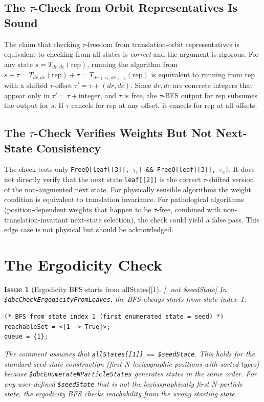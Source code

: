 \documentclass[12pt,a4paper]{article}
\theoremstyle{critical}
\newtheorem{issue}{Issue}
\theoremstyle{remark}
\begin{document}
\subsection{The $\tau$-Check from Orbit Representatives Is Sound}

The claim that checking $\tau$-freedom from translation-orbit representatives is
equivalent to checking from all states is \emph{correct} and the argument is rigorous.
For any state $s = T_{dr,dc}(\text{rep})$, running the algorithm from $s + \tau =
T_{dr,dc}(\text{rep}) + \tau = T_{dr+\tau_r, dc+\tau_c}(\text{rep})$ is equivalent to
running from $\text{rep}$ with a shifted $\tau$-offset $\tau' = \tau + (dr, dc)$. Since
$dr, dc$ are concrete integers that appear only in $\tau' = \tau + \text{integer}$, and
$\tau$ is free, the $\tau$-BFS output for rep subsumes the output for $s$. If $\tau$
cancels for rep at any offset, it cancels for rep at all offsets.

\subsection{The $\tau$-Check Verifies Weights But Not Next-State Consistency}

The check tests only \texttt{FreeQ[leaf[[3]], $\tau_r$] \&\& FreeQ[leaf[[3]], $\tau_c$]}.
It does not directly verify that the next state \texttt{leaf[[2]]} is the correct
$\tau$-shifted version of the non-augmented next state. For physically sensible
algorithms the weight condition is equivalent to translation invariance. For
pathological algorithms (position-dependent weights that happen to be $\tau$-free,
combined with non-translation-invariant next-state selection), the check could yield a
false pass. This edge case is not physical but should be acknowledged.

\section{The Ergodicity Check}
\label{sec:ergodicity}

\begin{issue}[Ergodicity BFS starts from allStates[[1]], not \$seedState]
\label{issue:ergoseed}
In \texttt{\$dbcCheckErgodicityFromLeaves}, the BFS always starts from state index~1:
\begin{lstlisting}
(* BFS from state index 1 (first enumerated state = seed) *)
reachableSet = <|1 -> True|>;
queue = {1};
\end{lstlisting}
The comment assumes that \texttt{allStates[[1]] == \$seedState}. This holds for the
standard seed-state construction (first $N$ lexicographic positions with sorted types)
because \texttt{\$dbcEnumerateNParticleStates} generates states in the same order. For
any user-defined \texttt{\$seedState} that is not the lexicographically first $N$-particle
state, the ergodicity BFS checks reachability from the wrong starting state.
\end{issue}
\end{document}
